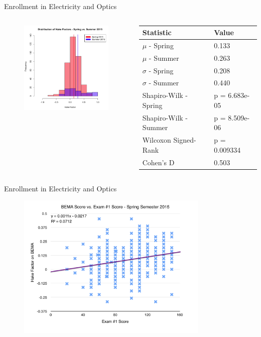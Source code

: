 \documentclass{beamer}
\begin{document}
\begin{frame}{Enrollment in Electricity and Optics}
\begin{columns}
\begin{column}{2in}
\begin{figure}
	\includegraphics[width=2in]{img/chapter4/hake_spring_vs_summer_filtered}
\end{figure}
\end{column}
\begin{column}{2in}
\begin{scriptsize}
\begin{table}
  \begin{tabular}{|l|l|}
    \hline
    \textbf{Statistic} & \textbf{Value} \\
	\hline
	$\mu$ - Spring & 0.133 \\
	\hline
	$\mu$ - Summer & 0.263 \\
	\hline
	$\sigma$ - Spring & 0.208 \\
	\hline
	$\sigma$ - Summer & 0.440 \\
	\hline
	Shapiro-Wilk - Spring & p = 6.683e-05 \\
	\hline
	Shapiro-Wilk - Summer & p = 8.509e-06 \\
	\hline
	Wilcoxon Signed-Rank & p = 0.009334 \\
	\hline
	Cohen's D & 0.503 \\
	\hline
  \end{tabular}
\end{table}
\end{scriptsize}
\end{column}
\end{columns}
\end{frame}

\begin{frame}{Enrollment in Electricity and Optics}
\begin{figure}
	\includegraphics[width=3.6in]{img/chapter4/bema_vs_ex1_sp15}
\end{figure}
\end{frame}
\end{document}
